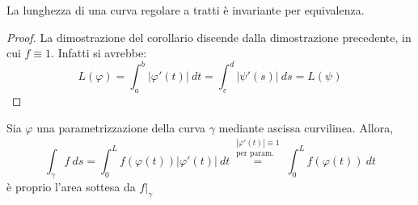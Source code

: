 \begin{corollary}
    La lunghezza di una curva regolare a tratti è invariante per equivalenza.
    \end{corollary}
    \begin{proof}
        La dimostrazione del corollario discende dalla dimostrazione precedente, in cui $f \equiv 1$.
        Infatti si avrebbe:
        \begin{equation}
            L(\varphi)=\int_{a}^{b}{|\varphi'(t)|\ dt}=\int_{c}^{d}{|\psi'(s)|\ ds}=L(\psi)
        \end{equation}
    \end{proof}
    \begin{oss}
        Sia $\varphi$ una parametrizzazione della curva $\gamma$ mediante ascissa curvilinea. Allora,
        \begin{equation}
            \int_{\gamma}{f \ ds}= \int_{0}^{L}{f(\varphi(t))|\varphi'(t)|\ dt} \overset{\substack{|\varphi'(t)| \equiv 1\\ \text{per param.}}}{=} \int_{0}^{L}{f(\varphi(t))\ dt}
        \end{equation}
        è proprio l'area sottesa da $f\Big|_{\gamma}$
    \end{oss}